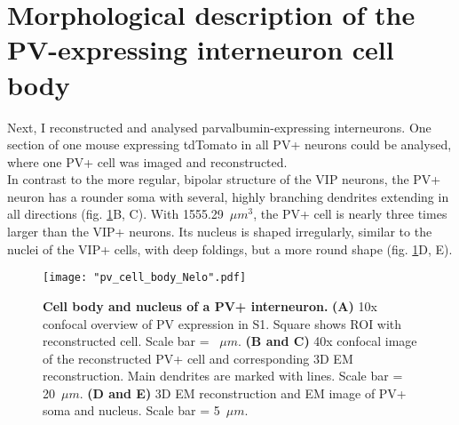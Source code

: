 \section{Morphological description of the PV-expressing interneuron cell body}
\label{sec:PV cell body}
Next, I reconstructed and analysed parvalbumin-expressing interneurons. One section of one mouse expressing tdTomato in all PV+ neurons could be analysed, where one PV+ cell was imaged and reconstructed.\\
In contrast to the more regular, bipolar structure of the VIP neurons, the PV+ neuron has a rounder soma with several, highly branching dendrites extending in all directions (fig. \ref{fig:pv_cell_body}B, C). With 1555.29~$\mu m^3$, the PV+ cell is nearly three times larger than the VIP+ neurons. Its nucleus is shaped irregularly, similar to the nuclei of the VIP+ cells, with deep foldings, but a more round shape (fig. \ref{fig:pv_cell_body}D, E).\\
\begin{figure}
	\captionsetup[figure]{indentation=0pt}
	\texttt{[image: "pv\_cell\_body\_Nelo".pdf]}
	\caption[Cell body and nucleus of a PV+ interneuron.]{\textbf{Cell body and nucleus of a PV+ interneuron.} \textbf{(A)} 10x confocal overview of PV expression in S1. Square shows ROI with reconstructed cell. Scale bar = ~$\mu m$. \textbf{(B and C)} 40x confocal image of the reconstructed PV+ cell and corresponding 3D EM reconstruction. Main dendrites are marked with lines. Scale bar = 20~$\mu m$. \textbf{(D and E)} 3D EM reconstruction and EM image of PV+ soma and nucleus. Scale bar = 5~$\mu m$.}
	\label{fig:pv_cell_body}
\end{figure}
